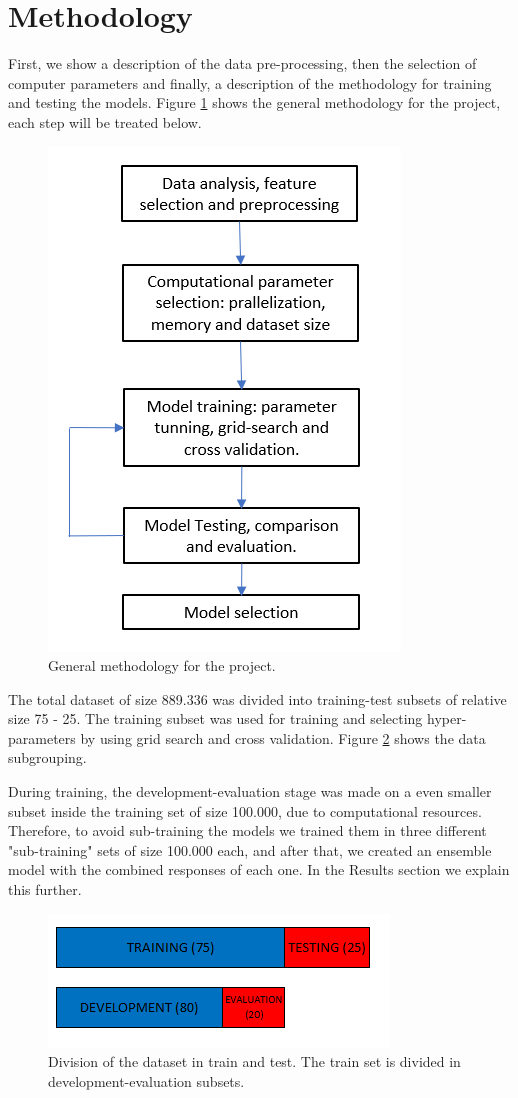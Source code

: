 \documentclass[]{article}
\begin{document}
\section{Methodology}
 First, we show a description of the data pre-processing, then the selection of computer parameters and finally, a description of the methodology for training and testing the models. Figure \ref{fig:generalmet} shows the general methodology for the project, each step will be treated below.  
\begin{figure}[ht!]
	\centering
	\includegraphics[width=0.4\linewidth]{TeX_files/Imagenes/general_met}
	\caption{General methodology for the project.}
	\label{fig:generalmet}
\end{figure}

The total dataset of size 889.336 was divided into training-test subsets of relative size 75 - 25. The training subset was used for training and selecting hyper-parameters by using grid search and cross validation. Figure \ref{fig:metho3} shows the data subgrouping.

During training, the development-evaluation stage was made on a even smaller subset inside the training set of size 100.000, due to computational resources. Therefore, to avoid sub-training the models we trained them in three different "sub-training" sets of size 100.000 each, and after that, we created an ensemble model with the combined responses of each one. In the Results section we explain this further.  

\begin{figure}[h!]
	\centering
	\includegraphics[width=0.6\linewidth]{TeX_files/Imagenes/metho_3}
	\caption{Division of the dataset in train and test. The train set is divided in development-evaluation subsets.}
	\label{fig:metho3}
\end{figure}
\end{document}
